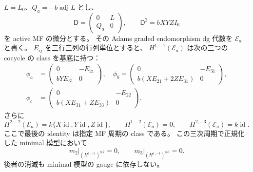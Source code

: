 \begin{proposition}
\label{prop:nfm-separated-boundary-active-products}
$L=L_0$、$Q_a=-b\operatorname{adj}L$ とし、
\[
 \mathsf D=\begin{pmatrix}0&L\\Q_a&0\end{pmatrix},\qquad
 \mathsf D^2=bXYZ I_6
\]
を active MF の微分とする。
その Adams graded endomorphism dg 代数を $\mathscr E_a$ と書く。
$E_{ij}$ を三行三列の行列単位とすると、
$H^{1,-1}(\mathscr E_a)$ は次の三つの cocycle の class を基底に持つ：
\[
 \begin{aligned}
 \phi_a&=\begin{pmatrix}0&-E_{21}\\bYE_{31}&0\end{pmatrix},\quad
 \phi_b=\begin{pmatrix}0&-E_{31}\\b(XE_{21}+2ZE_{31})&0\end{pmatrix},\\
 \phi_c&=\begin{pmatrix}0&-E_{22}\\b(XE_{31}+ZE_{33})&0\end{pmatrix}.
 \end{aligned}
\]
さらに
\[
 H^{2,-2}(\mathscr E_a)=k\{X\operatorname{id},Y\operatorname{id},Z\operatorname{id}\},
 \qquad H^{1,-2}(\mathscr E_a)=0,
 \qquad H^{2,-3}(\mathscr E_a)=k\operatorname{id}.
\]
ここで最後の identity は指定 MF 周期の class である。
この三次周期で正規化した minimal 模型において
\[
 m_2\big|_{(H^{1,-1})^{\otimes2}}=0,\qquad
 m_3\big|_{(H^{1,-1})^{\otimes3}}=0.
\]
後者の消滅も minimal 模型の gauge に依存しない。
\end{proposition}
